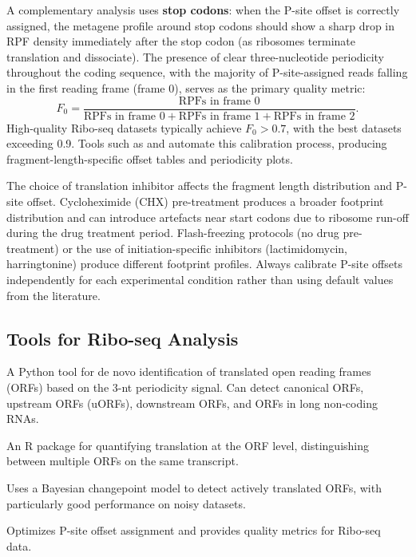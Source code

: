 A complementary analysis uses \textbf{stop codons}: when the P-site offset is correctly assigned, the metagene profile around stop codons should show a sharp drop in RPF density immediately after the stop codon (as ribosomes terminate translation and dissociate). The presence of clear three-nucleotide periodicity throughout the coding sequence, with the majority of P-site-assigned reads falling in the first reading frame (frame 0), serves as the primary quality metric:
\begin{equation}
  F_0 = \frac{\text{RPFs in frame 0}}{\text{RPFs in frame 0} + \text{RPFs in frame 1} + \text{RPFs in frame 2}}.
  \label{eq:specialized:frame-fraction}
\end{equation}
High-quality Ribo-seq datasets typically achieve $F_0 > 0.7$, with the best datasets exceeding 0.9. Tools such as  and  automate this calibration process, producing fragment-length-specific offset tables and periodicity plots.

\begin{warningbox}
The choice of translation inhibitor affects the fragment length distribution and P-site offset. Cycloheximide (CHX) pre-treatment produces a broader footprint distribution and can introduce artefacts near start codons due to ribosome run-off during the drug treatment period. Flash-freezing protocols (no drug pre-treatment) or the use of initiation-specific inhibitors (lactimidomycin, harringtonine) produce different footprint profiles. Always calibrate P-site offsets independently for each experimental condition rather than using default values from the literature.
\end{warningbox}

\subsection{Tools for Ribo-seq Analysis}
\label{subsec:specialized:riboseq-tools}

\begin{description}[style=nextline, itemsep=2pt]
  \item[\software{RiboCode}] A Python tool for de novo identification of translated open reading frames (ORFs) based on the 3-nt periodicity signal. Can detect canonical ORFs, upstream ORFs (uORFs), downstream ORFs, and ORFs in long non-coding RNAs.
  \item[\software{ORFquant}] An R package for quantifying translation at the ORF level, distinguishing between multiple ORFs on the same transcript.
  \item[\software{Ribotricer}] Uses a Bayesian changepoint model to detect actively translated ORFs, with particularly good performance on noisy datasets.
  \item[\software{RiboWaltz}] Optimizes P-site offset assignment and provides quality metrics for Ribo-seq data.
\end{description}


